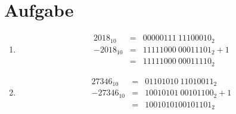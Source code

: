 \documentclass[DIN, pagenumber=false, fontsize=11pt, parskip=half]{scrartcl}
\begin{document}
    \section{Aufgabe}
    \begin{enumerate}[label = (\alph*)]
        \item 
            \begin{eqnarray*}
                {2018}_{10} &=& {0000 0111\ 1110 0010}_2 \\
                {-2018}_{10} &=& {1111 1000\ 0001 1101}_2 + 1 \\
                &=& {1111 1000\ 0001 1110}_2
            \end{eqnarray*}
        \item
            \begin{eqnarray*}
                {27346}_{10} &=& {0110 1010\ 1101 0011}_2 \\
                {-27346}_{10} &=& {1001 0101\ 0010 1100}_2 + 1\\
                &=& {1001010100101101}_2
            \end{eqnarray*}
    \end{enumerate}
\end{document}

